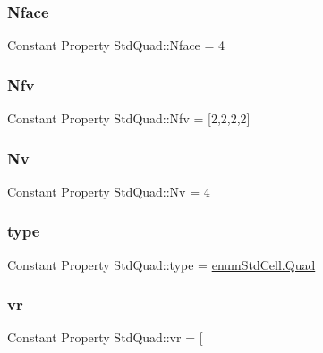 \subsubsection{\texorpdfstring{Nface}{Nface}}
{\footnotesize\ttfamily Constant Property Std\+Quad\+::\+Nface = 4}

\mbox{\label{class_std_quad_a230170b25ccb3ee32022d11cb01df64f}} 
\subsubsection{\texorpdfstring{Nfv}{Nfv}}
{\footnotesize\ttfamily Constant Property Std\+Quad\+::\+Nfv = \mbox{[}2,2,2,2\mbox{]}\textquotesingle{}}

\mbox{\label{class_std_quad_a92b472d27841677ab402588a926c5694}} 
\subsubsection{\texorpdfstring{Nv}{Nv}}
{\footnotesize\ttfamily Constant Property Std\+Quad\+::\+Nv = 4}

\mbox{\label{class_std_quad_a2a2014293743216446f22fd800b36b2c}} 
\subsubsection{\texorpdfstring{type}{type}}
{\footnotesize\ttfamily Constant Property Std\+Quad\+::type = \hyperlink{classenum_std_cell_ac4c2fa4e189e76e103f3ff9b1d19b9e7a79d1c44e78bdfebfd755a724f5e04029}{enum\+Std\+Cell.\+Quad}}

\mbox{\label{class_std_quad_a0888f306ffa8147e632292b4e7547404}} 
\subsubsection{\texorpdfstring{vr}{vr}}
{\footnotesize\ttfamily Constant Property Std\+Quad\+::vr = \mbox{[}}

\mbox{\label{class_std_quad_ae785166c7821862cffa780480e1e00e9}} 
